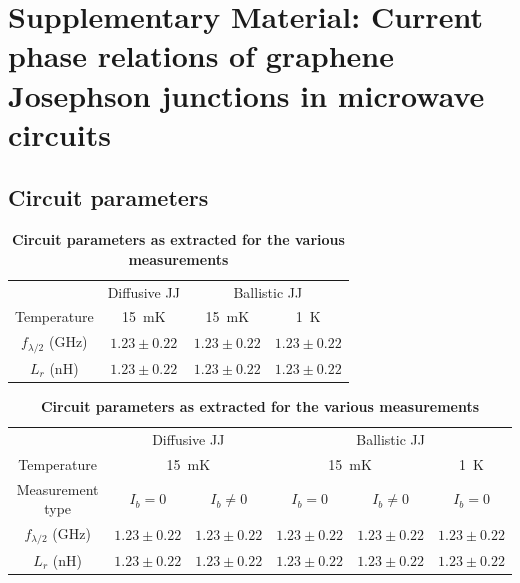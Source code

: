 \pagebreak
\clearpage



\section{Supplementary Material: Current phase relations of graphene Josephson junctions in microwave circuits}

\subsection{Circuit parameters}

\begin{table}
	\centering
	\caption{\textbf{Circuit parameters as extracted for the various measurements}}
	\begin{tabular}{cccc}
		\hline\hline
		& Diffusive JJ & \multicolumn{2}{c}{Ballistic JJ}  \\
		Temperature & \SI{15}{\milli\kelvin} & \SI{15}{\milli\kelvin} & \SI{1}{\kelvin} \\
		\hline
		$f_{\lambda/2}$ (\si{\giga\hertz}) & $1.23\pm0.22$ & $1.23\pm0.22$ & $1.23\pm0.22$ \\
		$L_r$ (\si{\nano\henry}) & $1.23\pm0.22$ & $1.23\pm0.22$ & $1.23\pm0.22$ \\
		\hline\hline
	\end{tabular}
	\label{tab:frLr}
\end{table}

\begin{table}
	\centering
	\caption{\textbf{Circuit parameters as extracted for the various measurements}}
	\begin{tabular}{cccccc}
		\hline\hline
		& \multicolumn{2}{c}{Diffusive JJ} & \multicolumn{3}{c}{Ballistic JJ}  \\
		Temperature & \multicolumn{2}{c}{\SI{15}{\milli\kelvin}} & \multicolumn{2}{c}{\SI{15}{\milli\kelvin}} & \SI{1}{\kelvin} \\
		Measurement type & $I_b=0$ & $I_b\neq 0$ & $I_b=0$ & $I_b\neq 0$ & $I_b=0$ \\
		\hline
		$f_{\lambda/2}$ (\si{\giga\hertz}) & $1.23\pm0.22$ & $1.23\pm0.22$ & $1.23\pm0.22$ & $1.23\pm0.22$ & $1.23\pm0.22$ \\
		$L_r$ (\si{\nano\henry}) & $1.23\pm0.22$ & $1.23\pm0.22$ & $1.23\pm0.22$ & $1.23\pm0.22$ & $1.23\pm0.22$ \\
		\hline\hline
	\end{tabular}
	\label{tab:frLr2}
\end{table}

